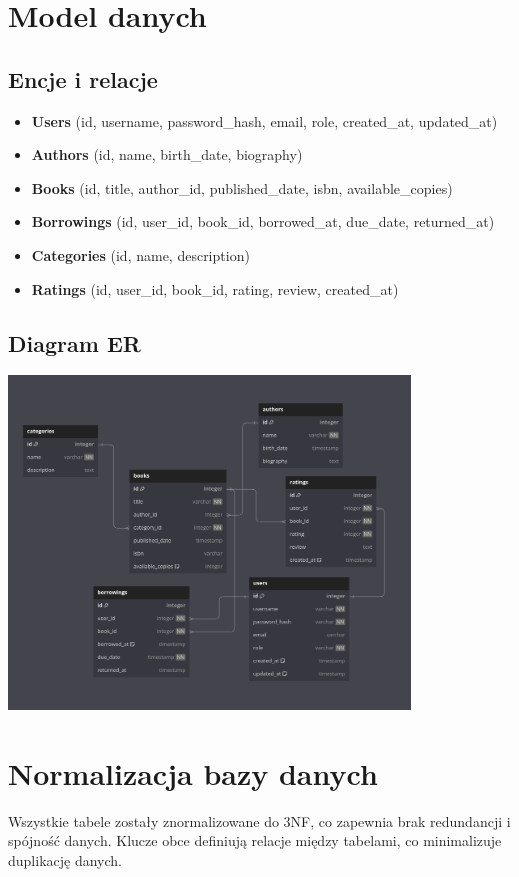 \documentclass{article}
\begin{document}
\section*{Model danych}
\subsection*{Encje i relacje}
\begin{itemize}
    \item \textbf{Users} (id, username, password\_hash, email, role, created\_at, updated\_at)
    \item \textbf{Authors} (id, name, birth\_date, biography)
    \item \textbf{Books} (id, title, author\_id, published\_date, isbn, available\_copies)
    \item \textbf{Borrowings} (id, user\_id, book\_id, borrowed\_at, due\_date, returned\_at)
    \item \textbf{Categories} (id, name, description)
    \item \textbf{Ratings} (id, user\_id, book\_id, rating, review, created\_at)
\end{itemize}

\subsection*{Diagram ER}
\begin{center}
    \includegraphics[width=0.8\textwidth]{diagram.png}
\end{center}

\section*{Normalizacja bazy danych}
Wszystkie tabele zostały znormalizowane do 3NF, co zapewnia brak redundancji i spójność danych. Klucze obce definiują relacje między tabelami, co minimalizuje duplikację danych.
\end{document}
